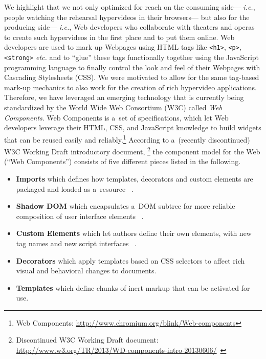 \documentclass[conference]{IEEEtran}
\begin{document}
We highlight that we not only optimized for reach on the consuming side---%
\emph{i.e.}, people watching the rehearsal hypervideos in their browsers---%
but also for the producing side---%
\emph{i.e.}, Web developers who collaborate with theaters and operas
to create such hypervideos in the first place and to put them online.
Web developers are used to mark up Webpages using HTML tags
like \texttt{<h1>}, \texttt{<p>}, \texttt{<strong>} \emph{etc.}
and to ``glue'' these tags functionally together using the JavaScript programming language
to finally control the look and feel of their Webpages with Cascading Stylesheets (CSS).
We were motivated to allow for the same tag-based mark-up mechanics
to also work for the creation of rich hypervideo applications.
Therefore, we have leveraged an emerging technology
that is currently being standardized by the World Wide Web Consortium (W3C)
called \emph{Web Components}.
Web Components is a~set of specifications, which let Web developers leverage
their HTML, CSS, and JavaScript knowledge to build widgets
that can be reused easily and reliably.\footnote{Web Components:
\url{http://www.chromium.org/blink/Web-components}}
According to a~(recently discontinued) W3C Working Draft introductory document,%
\footnote{Discontinued W3C Working Draft document:
\url{http://www.w3.org/TR/2013/WD-components-intro-20130606/}~\cite{cooney2013Webcomponents}}
the component model for the Web (``Web Components'') consists of five different pieces
listed in the following.

\begin{itemize}
  \item \textbf{Imports} which defines how templates, decorators and custom elements are packaged and loaded as a~resource%
  ~\cite{glazkov2014htmlimports}.
  \item \textbf{Shadow DOM} which encapsulates a~DOM subtree for more reliable composition of user interface elements%
  ~\cite{glazkov2014shadowdom}.    
  \item \textbf{Custom Elements} which let authors define their own elements, with new tag names and new script interfaces%
  ~\cite{glazkov2013customelements}.  
  \item \textbf{Decorators} which apply templates based on CSS selectors to affect rich visual and behavioral changes to documents.
  \item \textbf{Templates} which define chunks of inert markup that can be activated for use.  
\end{itemize}
\end{document}
